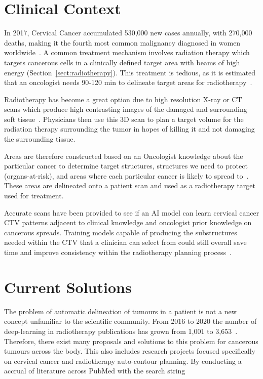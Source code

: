 \documentclass[11pt,twoside]{report}
\begin{document}
\setcounter{page}{1}
\fancyhead[LE,RO]{\slshape \rightmark}
\fancyhead[LO,RE]{\slshape \leftmark}

\section{Clinical Context}

In 2017, Cervical Cancer accumulated 530,000 new cases annually, with 270,000 deaths, making it the fourth most common malignancy diagnosed in women worldwide~\cite{cervical-cancer-epidemic}. A common treatment mechanism involves radiation therapy which targets cancerous cells in a clinically defined target area with beams of high energy (Section~\ref{sect:radiotherapy}). This treatment is tedious, as it is estimated that an oncologist needs 90-120 min to delineate target areas for radiotherapy~\cite{LIU2020184}.

Radiotherapy has become a great option due to high resolution X-ray or CT scans which produce high contrasting images of the damaged and surrounding soft tissue~\cite{radiotherapy-basic-concepts}. Physicians then use this 3D scan to plan a target volume for the radiation therapy surrounding the tumor in hopes of killing it and not damaging the surrounding tissue.

Areas are therefore constructed based on an Oncologist knowledge about the particular cancer to determine target structures, structures we need to protect (organs-at-risk), and areas where each particular cancer is likely to spread to~\cite{AMLART-data}. These areas are delineated onto a patient scan and used as a radiotherapy target used for treatment.

Accurate scans have been provided to see if an AI model can learn cervical cancer CTV patterns adjacent to clinical knowledge and oncologist prior knowledge on cancerous spreads. Training models capable of producing the substructures needed within the CTV that a clinician can select from could still overall save time and improve consistency within the radiotherapy planning process~\cite{AMLART-data}.

\section{Current Solutions}\label{sect:current-solutions}

The problem of automatic delineation of tumours in a patient is not a new concept unfamiliar to the scientific community. From 2016 to 2020 the number of deep-learning in radiotherapy publications has grown from 1,001 to 3,653~\cite{Lin2021-oz}. Therefore, there exist many proposals and solutions to this problem for cancerous tumours across the body. This also includes research projects focused specifically on cervical cancer and radiotherapy auto-contour planning. By conducting a accrual of literature across PubMed with the search string
\end{document}
